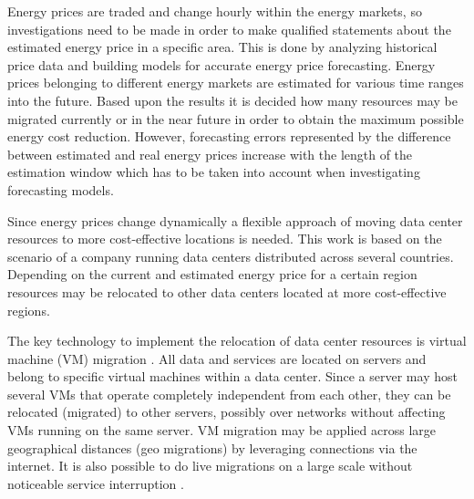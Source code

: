 \documentclass[a4paper]{article}
\begin{document}
Energy prices are traded and change hourly within the energy markets, so investigations need to be made in order to make qualified statements about the estimated energy price in a specific area.
This is done by analyzing historical price data and building models for accurate energy price forecasting. Energy prices belonging to different energy markets are estimated for various time ranges into the future. Based upon the results it is decided how many resources may be migrated currently or in the near future in order to obtain the maximum possible energy cost reduction. 
However, forecasting errors represented by the difference between estimated and real energy prices increase with the length of the estimation window which has to be taken into account when investigating forecasting models. 



Since energy prices change dynamically a flexible approach of moving data center resources to more cost-effective locations is needed. This work is based on the scenario of a company running data centers distributed across several countries. Depending on the current and estimated energy price for a certain region resources may be relocated to other data centers located at more cost-effective regions.

The key technology to implement the relocation of data center resources is virtual machine (VM) migration \cite{nelson2009virtual}. All data and services are located on servers and belong to specific virtual machines within a data center. Since a server may host several VMs that operate completely independent from each other, they can be relocated (migrated) to other servers, possibly over networks without affecting VMs running on the same server. VM migration may be applied across large geographical distances (geo migrations) by leveraging connections via the internet. It is also possible to do live migrations on a large scale without noticeable service interruption \cite{celesti2010improving}. 
\end{document}
